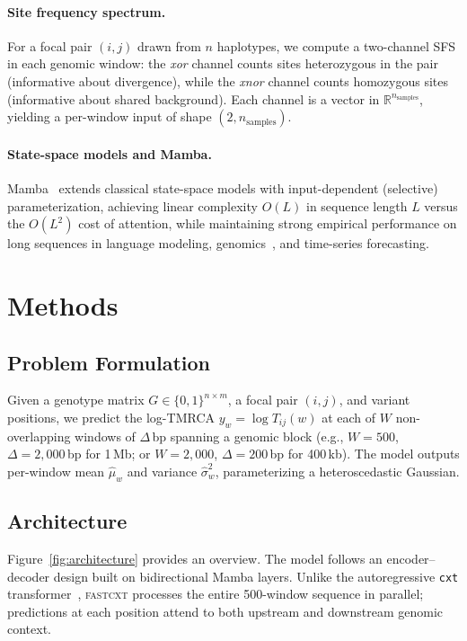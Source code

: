 \documentclass{article}
\begin{document}
\paragraph{Site frequency spectrum.}
For a focal pair $(i,j)$ drawn from $n$ haplotypes, we compute a two-channel SFS in each
genomic window: the \emph{xor} channel counts sites heterozygous in the pair (informative about
divergence), while the \emph{xnor} channel counts homozygous sites (informative about shared
background). Each channel is a vector in $\mathbb{R}^{n_\mathrm{samples}}$, yielding a
per-window input of shape $(2, n_\mathrm{samples})$.

\paragraph{State-space models and Mamba.}
Mamba~\citep{gu2024mamba} extends classical state-space models with input-dependent (selective)
parameterization, achieving linear complexity $O(L)$ in sequence length $L$ versus the
$O(L^2)$ cost of attention, while maintaining strong empirical performance on long sequences
in language modeling, genomics~\citep{schiff2024caduceus}, and time-series forecasting.

\section{Methods}

\subsection{Problem Formulation}

Given a genotype matrix $G \in \{0, 1\}^{n \times m}$, a focal pair $(i,j)$, and variant
positions, we predict the log-TMRCA $y_w = \log T_{ij}(w)$ at each of $W$ non-overlapping
windows of $\Delta$\,bp spanning a genomic block (e.g., $W{=}500$, $\Delta{=}2{,}000$\,bp
for 1\,Mb; or $W{=}2{,}000$, $\Delta{=}200$\,bp for 400\,kb). The model outputs per-window mean
$\hat{\mu}_w$ and variance $\hat{\sigma}^2_w$, parameterizing a heteroscedastic Gaussian.

\subsection{Architecture}

Figure~\ref{fig:architecture} provides an overview. The model follows an encoder--decoder
design built on bidirectional Mamba layers. Unlike the autoregressive \texttt{cxt}
transformer~\citep{korfmann2025cxt}, \textsc{fastcxt} processes the entire 500-window
sequence in parallel; predictions at each position attend to both upstream and downstream
genomic context.
\end{document}
